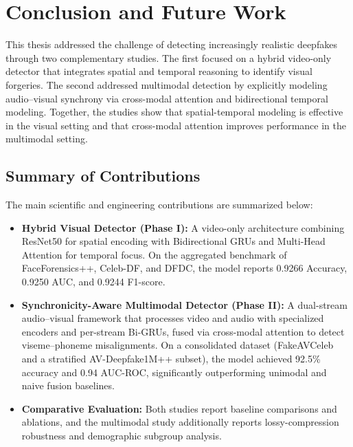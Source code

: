 \chapter{Conclusion and Future Work}
\label{ch:conclusion-future}

This thesis addressed the challenge of detecting increasingly realistic deepfakes through two complementary studies. The first focused on a hybrid video-only detector that integrates spatial and temporal reasoning to identify visual forgeries. The second addressed multimodal detection by explicitly modeling audio--visual synchrony via cross-modal attention and bidirectional temporal modeling. Together, the studies show that spatial-temporal modeling is effective in the visual setting and that cross-modal attention improves performance in the multimodal setting.

\section{Summary of Contributions}
The main scientific and engineering contributions are summarized below:
\begin{itemize}
    \item \textbf{Hybrid Visual Detector (Phase I):} A video-only architecture combining ResNet50 for spatial encoding with Bidirectional GRUs and Multi-Head Attention for temporal focus. On the aggregated benchmark of FaceForensics++, Celeb-DF, and DFDC, the model reports 0.9266 Accuracy, 0.9250 AUC, and 0.9244 F1-score.
    \item \textbf{Synchronicity-Aware Multimodal Detector (Phase II):} A dual-stream audio--visual framework that processes video and audio with specialized encoders and per-stream Bi-GRUs, fused via cross-modal attention to detect viseme--phoneme misalignments. On a consolidated dataset (FakeAVCeleb and a stratified AV-Deepfake1M++ subset), the model achieved 92.5\% accuracy and 0.94 AUC-ROC, significantly outperforming unimodal and naive fusion baselines.
    \item \textbf{Comparative Evaluation:} Both studies report baseline comparisons and ablations, and the multimodal study additionally reports lossy-compression robustness and demographic subgroup analysis.
\end{itemize}

